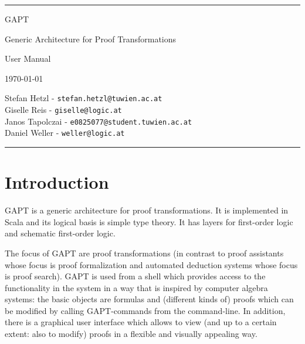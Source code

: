 \documentclass[a4paper,11pt]{article}
\begin{document}
\begin{titlepage}
\begin{center}

\hrule

\vspace*{20mm}

{\Huge GAPT}

\vspace*{5mm}

{\huge Generic Architecture for Proof Transformations}

\vspace*{20mm}

{\Huge User Manual}

\vspace*{60mm}

{\Large \today}

\vspace*{20mm}

{\Large
Stefan Hetzl - \texttt{stefan.hetzl@tuwien.ac.at}\\
Giselle Reis - \texttt{giselle@logic.at}\\
Janos Tapolczai - \texttt{e0825077@student.tuwien.ac.at}\\
Daniel Weller - \texttt{weller@logic.at}
}

\vspace*{20mm}

\hrule
\end{center}



\end{titlepage}

\tableofcontents
\vfill
\pagebreak

\section{Introduction}

GAPT is a generic architecture for proof transformations. It is implemented
in Scala and its logical basis is simple type theory. It has
layers for first-order logic and schematic first-order logic.

The focus of GAPT are proof transformations (in contrast to proof assistants
whose focus is proof formalization and automated deduction systems whose focus
is proof search). GAPT is used from a shell which provides access to the functionality
in the system in a way that is inspired by computer algebra systems: the basic
objects are formulas and (different kinds of) proofs which can be modified
by calling GAPT-commands from the command-line. In addition, there
is a graphical user interface which allows to view (and up to a certain extent:
also to modify) proofs in a flexible and visually appealing way.
\end{document}
